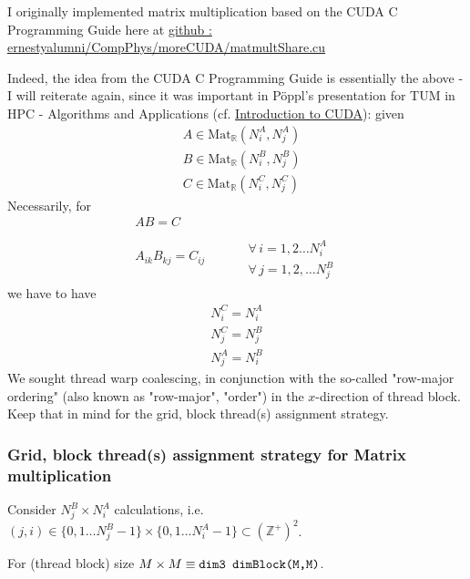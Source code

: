 \documentclass[10pt]{amsart}
\begin{document}
\begin{multicols*}{2}
I originally implemented matrix multiplication based on the CUDA C Programming Guide here at \href{https://github.com/ernestyalumni/CompPhys/blob/master/moreCUDA/matmultShare.cu}{github : ernestyalumni/CompPhys/moreCUDA/matmultShare.cu}

Indeed, the idea from the CUDA C Programming Guide is essentially the above - I will reiterate again, since it was important in P\"oppl's presentation for TUM in HPC - Algorithms and Applications (cf. \href{http://www5.in.tum.de/lehre/vorlesungen/hpc/WS16/tutorial/cuda_p2.pdf}{Introduction to CUDA}): given
\[
\begin{aligned}
	& A \in \text{Mat}_{\mathbb{R}}(N_i^A,N_j^A) \\ 
	& B \in \text{Mat}_{\mathbb{R}}(N_i^B,N_j^B) \\
	& C \in \text{Mat}_{\mathbb{R}}(N_i^C,N_j^C) 
\end{aligned}
\]
Necessarily, for 
\begin{equation}
\begin{gathered}
AB=C \\
A_{ik}B_{kj} =C_{ij}  \qquad \, \begin{aligned} & \qquad \\ 
	& \forall \, i = 1,2\dots N_i^A \\ 
	& \forall \, j = 1,2,\dots N_j^B \end{aligned}
\end{gathered}
\end{equation}
we have to have 
\[
\begin{gathered}
N_i^C = N_i^A \\
N_j^C = N_j^B \\
N_j^A = N^B_i
\end{gathered}
\]
We sought thread warp coalescing, in conjunction with the so-called "row-major ordering" (also known as "row-major", "order") in the $x$-direction of thread block.  Keep that in mind for the grid, block thread(s) assignment strategy.  

\subsubsection{Grid, block thread(s) assignment strategy for Matrix multiplication} 

Consider $N_j^B \times N_i^A$ calculations, i.e. $(j,i) \in \lbrace 0,1\dots N_j^B - 1\rbrace \times \lbrace 0 ,1\dots N_i^A -1\rbrace \subset (\mathbb{Z}^+)^2 $.  

For (thread block) size $M\times M \equiv \verb|dim3 dimBlock(M,M)|$.  


\end{multicols*}
\end{document}
